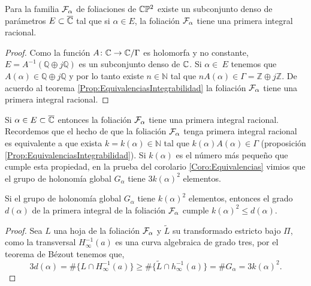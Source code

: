 \begin{Teorema}
\label{Teo:DensidadPrimerasIntegrales}
Para la familia $\mathcal{F}_{\alpha}$ de foliaciones de $\mathbb{C}\mathbb{P}^2$ existe un subconjunto denso de parámetros $E\subset\overline{\mathbb{C}}$ tal que si $\alpha\in E$, la foliación $\mathcal{F}_{\alpha}$ tiene una primera integral racional.
\end{Teorema}
\begin{proof}
Como la función $A\colon\mathbb{C}\rightarrow\mathbb{C}/\Gamma$ es holomorfa y no constante, $E=A^{-1}(\mathbb{Q}\oplus j\mathbb{Q})$ es un subconjunto denso de $\mathbb{C}$. Si $\alpha\in\ E$ tenemos que $A(\alpha)\in\mathbb{Q}\oplus j\mathbb{Q}$ y por lo tanto existe $n\in\mathbb{N}$ tal que $nA(\alpha)\in\Gamma=\mathbb{Z}\oplus j\mathbb{Z}$. De acuerdo al teorema \ref{Prop:EquivalenciasIntegrabilidad} la foliación $\mathcal{F}_{\alpha}$ tiene una primera integral racional.
\end{proof}

Si $\alpha\in E\subset\overline{\mathbb{C}}$ entonces la foliación $\mathcal{F}_{\alpha}$ tiene una primera integral racional. Recordemos que el hecho de que la foliación $\mathcal{F}_{\alpha}$ tenga primera integral racional es equivalente a que exista $k=k(\alpha)\in\mathbb{N}$ tal que $k(\alpha)A(\alpha)\in\Gamma$ (proposición \ref{Prop:EquivalenciasIntegrabilidad}). Si $k(\alpha)$ es el número más pequeño que cumple esta propiedad, en la prueba del corolario \ref{Coro:Equivalencias} vimios que el grupo de holonomía global $G_{\alpha}$ tiene $3k(\alpha)^{2}$ elementos.

\begin{Lema}
\label{Lema:Cota}
Si el grupo de holonomía global $G_{\alpha}$ tiene $k(\alpha)^{2}$ elementos, entonces el grado $d(\alpha)$ de la primera integral de la foliación $\mathcal{F}_{\alpha}$ cumple $k(\alpha)^{2}\leq d(\alpha)$.
\end{Lema} 
\begin{proof}
Sea $L$ una hoja de la foliación $\mathcal{F}_{\alpha}$ y $\tilde{L}$ su transformado estricto bajo $\Pi$, como la transversal $H^{-1}_{\infty}(a)$ es una curva algebraica de grado tres, por el teorema de Bézout tenemos que,
$$3d(\alpha)=\#\{L\cap H_{\infty}^{-1}(a)\}\geq\#\{\tilde{L}\cap h_{\infty}^{-1}(a)\}=\#G_{\alpha}=3k(\alpha)^{2}.$$
\end{proof}

